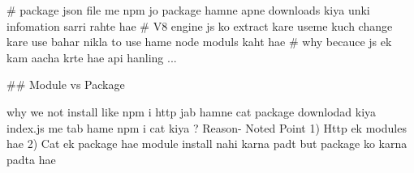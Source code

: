 # package json file me npm jo package hamne apne downloads  kiya unki infomation sarri rahte hae 
# V8 engine js ko extract kare useme kuch change kare use bahar nikla to use hame node moduls kaht hae
# why becauce js ek kam aacha krte hae api hanling ...


##  Module vs Package

why we not install like npm i http jab hamne cat package downlodad kiya index.js me tab hame npm i cat kiya ? Reason-
 Noted Point 1) Http ek modules hae 2) Cat ek package hae     
module install nahi karna padt but package ko karna padta hae
 